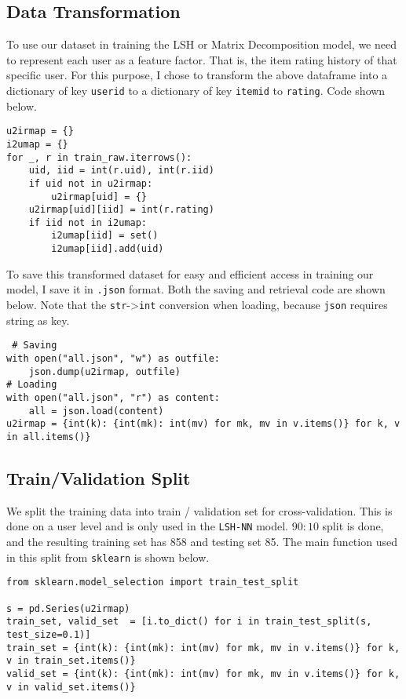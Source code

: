 \documentclass{scrartcl}
\begin{document}
\subsection{Data Transformation}
To use our dataset in training the LSH or Matrix Decomposition model, we need to represent each user as a feature factor. That is, the item rating history of that specific user. For this purpose, I chose to transform the above dataframe into a dictionary of key \texttt{userid} to a dictionary of key \texttt{itemid} to \texttt{rating}. Code shown below.
\begin{lstlisting}
u2irmap = {}
i2umap = {}
for _, r in train_raw.iterrows():
    uid, iid = int(r.uid), int(r.iid)
    if uid not in u2irmap:
        u2irmap[uid] = {}
    u2irmap[uid][iid] = int(r.rating)
    if iid not in i2umap:
        i2umap[iid] = set()
		i2umap[iid].add(uid)
\end{lstlisting}
To save this transformed dataset for easy and efficient access in training our model, I save it in \texttt{.json} format. Both the saving and retrieval code are shown below. Note that the \texttt{str}->\texttt{int} conversion when loading, because \texttt{json} requires string as key.
\begin{lstlisting}
 # Saving
with open("all.json", "w") as outfile:
    json.dump(u2irmap, outfile)
# Loading
with open("all.json", "r") as content:
    all = json.load(content)
u2irmap = {int(k): {int(mk): int(mv) for mk, mv in v.items()} for k, v in all.items()}
\end{lstlisting}

\subsection{Train/Validation Split}
We split the training data into train / validation set for cross-validation. This is done on a user level and is only used in the \texttt{LSH-NN} model. $90:10$ split is done, and the resulting training set has 858 and testing set 85. The main function used in this split from \texttt{sklearn} is shown below.
\begin{lstlisting}
from sklearn.model_selection import train_test_split

s = pd.Series(u2irmap)
train_set, valid_set  = [i.to_dict() for i in train_test_split(s, test_size=0.1)]
train_set = {int(k): {int(mk): int(mv) for mk, mv in v.items()} for k, v in train_set.items()}
valid_set = {int(k): {int(mk): int(mv) for mk, mv in v.items()} for k, v in valid_set.items()}
\end{lstlisting}
\end{document}

